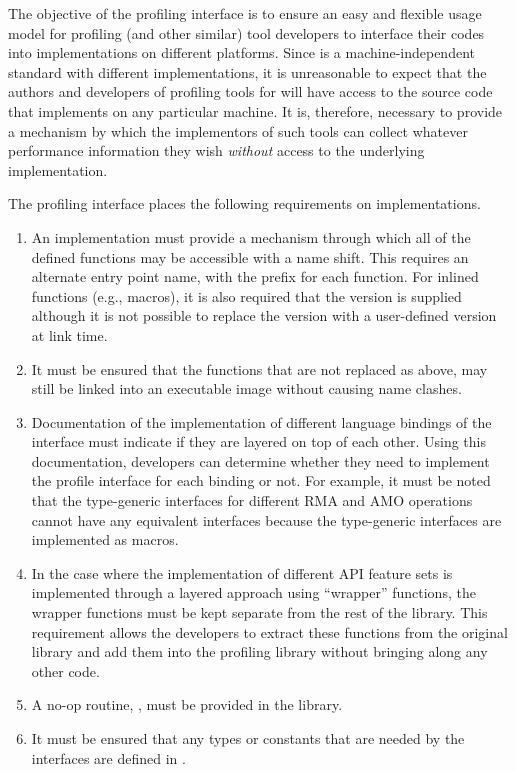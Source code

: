 The objective of the \openshmem profiling interface is to ensure an 
easy and flexible usage model for profiling (and other similar) 
tool developers to interface their codes into \openshmem 
implementations on different platforms. Since \openshmem is a 
machine-independent standard with different implementations, it is 
unreasonable to expect that the authors and developers of profiling 
tools for \openshmem will have access to the source code that 
implements \openshmem on any particular machine. It is, therefore,  
necessary to provide a mechanism by which the implementors of such 
tools can collect whatever performance information they wish 
\emph{without} access to the underlying implementation.

The \openshmem profiling interface places the following requirements 
on implementations. 

\begin{enumerate}
\item An \openshmem implementation must provide a mechanism through 
which all of the \openshmem defined functions may be accessible 
with a name shift. This requires an alternate 
entry point name, with the prefix  for each 
\openshmem function. For \openshmem inlined functions (e.g., macros), 
it is also required that the  version is supplied 
although it is not possible to replace the  version 
with a user-defined version at link time.
\item It must be ensured that the \openshmem functions that are not 
replaced as above, may still be linked into an executable image 
without causing name clashes. 
\item Documentation of the implementation of different language 
bindings of the \openshmem interface must indicate if they 
are layered on top of each other. Using this documentation,   
developers can determine whether they need to implement the 
profile interface for each binding or not. For example, it must 
be noted that the \openshmem \Cstd[11] type-generic interfaces for 
different \ac{RMA} and \ac{AMO} operations cannot have any equivalent
 interfaces because the \Cstd[11] type-generic 
interfaces are implemented as macros.
\item In the case where the implementation of different \ac{API}  
feature sets is implemented through a layered approach using 
``wrapper'' functions, the wrapper functions must be kept separate 
from the rest of the library. This requirement allows the developers 
to extract these functions from the original \openshmem library 
and add them into the profiling library without bringing along any 
other code.
\item A no-op routine, , must be provided 
in the \openshmem library.
\item It must be ensured that any \openshmem types or constants that are 
needed by the  interfaces are defined in .
\end{enumerate}

